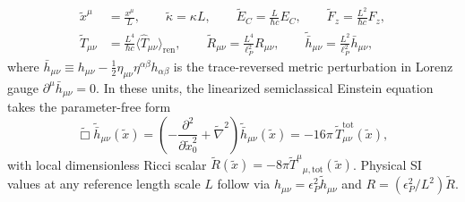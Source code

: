 \documentclass[aps,prd,twocolumn,10pt,showkeys,nofootinbib,floatfix,longbibliography]{revtex4-2}
\begin{document}
\begin{align}
\tilde{x}^\mu &= \frac{x^\mu}{L}, \qquad \tilde{\kappa} = \kappa L, \qquad \tilde{E}_C = \frac{L}{\hbar c} E_C, \qquad \tilde{F}_z = \frac{L^2}{\hbar c} F_z, \nonumber\\
\tilde{T}_{\mu\nu} &= \frac{L^4}{\hbar c} \langle \hat{T}_{\mu\nu} \rangle_{\mathrm{ren}}, \qquad \tilde{R}_{\mu\nu} = \frac{L^4}{\ell_P^2} R_{\mu\nu}, \qquad \tilde{\bar{h}}_{\mu\nu} = \frac{L^2}{\ell_P^2} \bar{h}_{\mu\nu},
\label{eq:planck_units}
\end{align}
where $\bar{h}_{\mu\nu} \equiv h_{\mu\nu} - \frac{1}{2}\eta_{\mu\nu}\eta^{\alpha\beta}h_{\alpha\beta}$ is the trace-reversed metric perturbation in Lorenz gauge $\partial^\mu \bar{h}_{\mu\nu} = 0$. In these units, the linearized semiclassical Einstein equation takes the parameter-free form
\begin{equation}
\tilde{\Box} \tilde{\bar{h}}_{\mu\nu}(\tilde{x}) = \left(-\frac{\partial^2}{\partial \tilde{x}_0^2} + \tilde{\nabla}^2\right)\tilde{\bar{h}}_{\mu\nu}(\tilde{x}) = -16\pi \, \tilde{T}_{\mu\nu}^{\mathrm{tot}}(\tilde{x}),
\label{eq:dimensionless_einstein}
\end{equation}
with local dimensionless Ricci scalar $\tilde{R}(\tilde{x}) = -8\pi \tilde{T}^\mu{}_{\mu,\mathrm{tot}}(\tilde{x})$. Physical SI values at any reference length scale $L$ follow via $h_{\mu\nu} = \epsilon_P^2 \tilde{h}_{\mu\nu}$ and $R = (\epsilon_P^2/L^2)\tilde{R}$.
\end{document}
